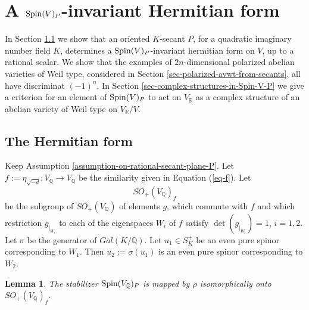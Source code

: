 \documentclass[12pt]{amsart}
\numberwithin{equation}{subsection}
\theoremstyle{plain}
\newtheorem{lem}[thm]{Lemma}
\theoremstyle{definition}
\newcommand{\QQ}{{\mathbb Q}}
\newcommand{\RR}{{\mathbb R}}
\newcommand{\cm}{\eta}
\newcommand{\Spin}{{\rm Spin}}
\newcommand{\restricted}[2]{#1_{\mid_{#2}}}
\begin{document}
% 
\section{A $\Spin(V)_P$-invariant Hermitian form}
\label{sec-Hermitian-form}
In Section \ref{subsec--Hermitian-form} 
we show that an oriented $K$-secant $P$, for a quadratic imaginary number field $K$, determines a $\Spin(V)_P$-invariant hermitian form on $V$, up to a rational scalar. We show that the examples of $2n$-dimensional polarized abelian varieties of Weil type, considered in Section \ref{sec-polarized-avwt-from-secants}, all have discriminat $(-1)^n$. In Section \ref{sec-complex-structures-in-Spin-V-P}
we give a criterion for an element of $\Spin(V)_P$ to act on $V_\RR$ as a complex structure of an abelian variety of Weil type on $V_\RR/V$.
% 
\subsection{The Hermitian form}
\label{subsec--Hermitian-form}
Keep Assumption \ref{assumption-on-rational-secant-plane-P}. Let 
$f:=\cm_{\sqrt{-d}}:V_\QQ\rightarrow V_\QQ$
be the similarity given in Equation (\ref{eq-f}).
Let 
\begin{equation}
\label{eq-so-f}
SO_+(V_\QQ)_f 
\end{equation}
be the subgroup of $SO_+(V_\QQ)$ of elements $g$, which commute with $f$ and which
restriction $\restricted{g}{W_i}$ to each of the eigenspaces $W_i$ of $f$ satisfy $\det(\restricted{g}{W_i})=1$, $i=1,2$.
Let $\sigma$ be the generator of $Gal(K/\QQ)$. 
Let $u_1\in S^+_K$ be an even pure spinor corresponding to $W_1$. Then $u_2:=\sigma(u_1)$ is an even pure spinor corresponding to $W_2$.

\begin{lem}
\label{lemma-stabilizer-is-isomorphic-to-so-f}
The stabilizer $\Spin(V_\QQ)_P$ 
is mapped by $\rho$ isomorphically onto $SO_+(V_\QQ)_f$. 
\end{lem}
\end{document}
